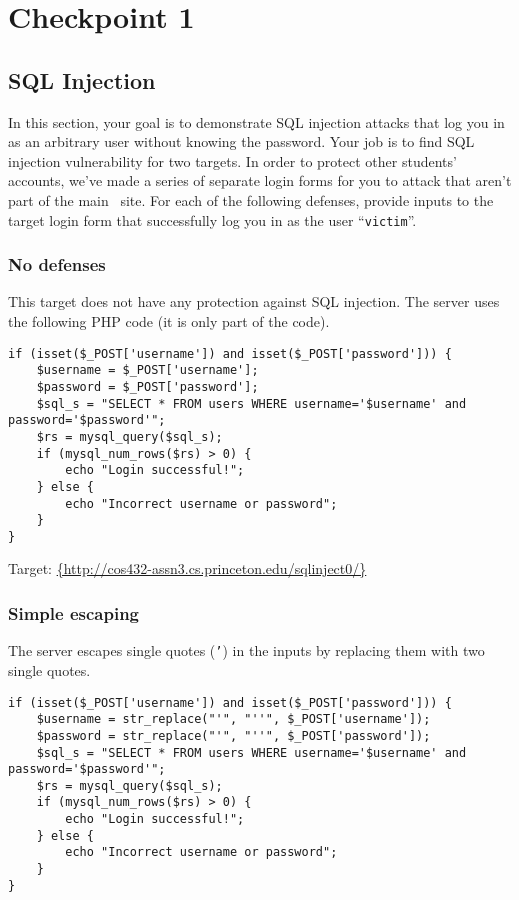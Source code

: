 \documentclass[letterpaper,12pt]{report}
\newcommand{\bungledomain}{http://cos432-assn3.cs.princeton.edu}
\begin{document}
\newpage

\section{Checkpoint 1}
\label{sec:checkpoint_1}

\subsection{SQL Injection}
\label{sec:sql_injection}
In this section, your goal is to demonstrate SQL injection attacks that log you in as an arbitrary user without knowing the password. Your job is to find SQL injection vulnerability for two targets. In order to protect other students' accounts, we've made a series of separate login forms for you to attack that aren't part of the main \bungle\ site.  For each of the following defenses, provide inputs to the target login form that successfully log you in as the user ``\texttt{victim}''.

\subsubsection{No defenses}
\label{sec:sql_no_defenses}
This target does not have any protection against SQL injection. 
The server uses the following PHP code (it is only part of the code). 
{\vspace{-10pt}\small\begin{verbatim}
if (isset($_POST['username']) and isset($_POST['password'])) {
    $username = $_POST['username'];
    $password = $_POST['password'];
    $sql_s = "SELECT * FROM users WHERE username='$username' and password='$password'";
    $rs = mysql_query($sql_s);
    if (mysql_num_rows($rs) > 0) {
        echo "Login successful!";
    } else {
        echo "Incorrect username or password";
    }
}
\end{verbatim}}
\vspace{-10pt}
\smallskip

Target: \url{{\bungledomain/sqlinject0/}}

\subsubsection{Simple escaping}
\label{sec:sql_simple_escaping}
The server escapes single quotes (\texttt{'}) in the inputs by replacing them with two single quotes.
{\vspace{-10pt}\small\begin{verbatim}
if (isset($_POST['username']) and isset($_POST['password'])) {
    $username = str_replace("'", "''", $_POST['username']);
    $password = str_replace("'", "''", $_POST['password']);
    $sql_s = "SELECT * FROM users WHERE username='$username' and password='$password'";
    $rs = mysql_query($sql_s);
    if (mysql_num_rows($rs) > 0) {
        echo "Login successful!";
    } else {
        echo "Incorrect username or password";
    }
}
\end{verbatim}}
\vspace{-10pt}
\smallskip
\end{document}
